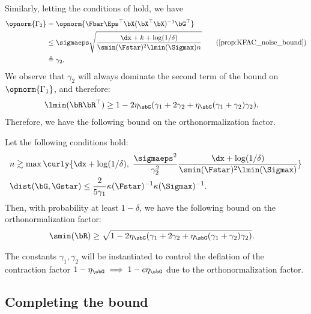 Similarly, letting the conditions of  hold, we have
\begin{align*}
    \opnorm{\Gamma_2} &= \opnorm{\Fbar \Eps^\top \bX (\bX^\top \bX)^{-1} \bG^\top} \\
    &\leq \sigmaeps  \sqrt{\frac{\dx + k + \log(1/\delta)}{\smin(\Fstar)^2\lmin(\Sigmax) n}} \tag{\Cref{prop:KFAC_noise_bound}} \\
    &\triangleq \gamma_2.
\end{align*}
We observe that $\gamma_2$ will always dominate the second term of the bound on $\opnorm{\Gamma_1}$, and therefore:
\begin{align*}
    \lmin(\bR \bR^\top) &\geq 1 - 2\eta_\sbG(\gamma_1 + 2\gamma_2 + \eta_\sbG(\gamma_1 + \gamma_2)\gamma_2).
\end{align*}
Therefore, we have the following bound on the orthonormalization factor.
\begin{proposition}\label{prop:linrep_orth_bound}
Let the following conditions hold:
    \begin{align*}
        &n \gtrsim \max\curly{\dx + \log(1/\delta),\; \frac{\sigmaeps^2}{\gamma_2^2} \frac{\dx + \log(1/\delta)}{\smin(\Fstar)^2\lmin(\Sigmax)}} \\
        &\dist(\bG, \Gstar) \leq \frac{2}{5\gamma_1} \kappa(\Fstar)^{-1} \kappa(\Sigmax)^{-1}.
    \end{align*}
    Then, with probability at least $1 - \delta$, we have the following bound on the orthonormalization factor:
    \begin{align*}
        \smin(\bR) &\geq \sqrt{1 - 2\eta_\sbG(\gamma_1 + 2\gamma_2 + \eta_\sbG(\gamma_1 + \gamma_2)\gamma_2)}.
    \end{align*}
\end{proposition}
The constants $\gamma_1, \gamma_2$ will be instantiated to control the deflation of the contraction factor $1-\eta_\sbG \implies 1-c\eta_\sbG$ due to the orthonormalization factor.

\subsection*{Completing the bound}

